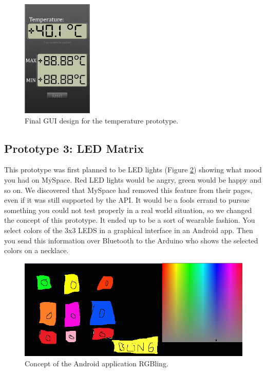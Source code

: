 \begin{figure}[H]
\centering 
\includegraphics[width=0.3\textwidth]{img/prototype2-gui.png}
\caption{Final GUI design for the temperature prototype.}
\label{fig:prototype2-gui}
\end{figure}

	
\subsection{Prototype 3: LED Matrix} \label{section:prototype-led}
This prototype was first planned to be LED lights (Figure \ref{fig:design-ledmatrix}) showing what mood you had on MySpace.
Red LED lights would be angry, green would be happy and so on. We discovered that MySpace had removed this feature from their pages,
even if it was still supported by the API. It would be a fools errand to pursue something you could not test properly
in a real world situation, so we changed the concept of this prototype. It ended up to be a sort of wearable fashion.
You select colors of the 3x3 LEDS in a graphical interface in an Android app. Then you send this information over Bluetooth
to the Arduino who shows the selected colors on a necklace.

\begin{figure}
	\begin{center}
	\includegraphics[scale=0.7]{img/prototype3rgBling.png}
	\end{center}
	\caption{Concept of the Android application RGBling.}
	\label{fig:design-ledmatrix}
\end{figure}

